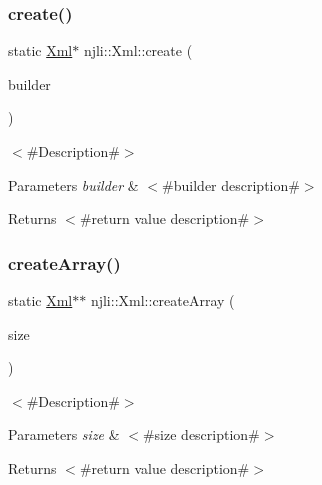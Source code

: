 \subsubsection{\texorpdfstring{create()}{create()}\hspace{0.1cm}{\footnotesize\ttfamily [3/3]}}
{\footnotesize\ttfamily static \mbox{\hyperlink{classnjli_1_1_xml}{Xml}}$\ast$ njli\+::\+Xml\+::create (\begin{DoxyParamCaption}\item[{const \mbox{\hyperlink{classnjli_1_1_xml_builder}{Xml\+Builder}} \&}]{builder }\end{DoxyParamCaption})\hspace{0.3cm}{\ttfamily [static]}}

$<$\#\+Description\#$>$


\begin{DoxyParams}{Parameters}
{\em builder} & $<$\#builder description\#$>$\\
\hline
\end{DoxyParams}
\begin{DoxyReturn}{Returns}
$<$\#return value description\#$>$ 
\end{DoxyReturn}
\mbox{\label{classnjli_1_1_xml_a458f6f226b134cee2bd70e3592a0988b}} 
\subsubsection{\texorpdfstring{create\+Array()}{createArray()}}
{\footnotesize\ttfamily static \mbox{\hyperlink{classnjli_1_1_xml}{Xml}}$\ast$$\ast$ njli\+::\+Xml\+::create\+Array (\begin{DoxyParamCaption}\item[{const \mbox{\hyperlink{_util_8h_a10e94b422ef0c20dcdec20d31a1f5049}{u32}}}]{size }\end{DoxyParamCaption})\hspace{0.3cm}{\ttfamily [static]}}

$<$\#\+Description\#$>$


\begin{DoxyParams}{Parameters}
{\em size} & $<$\#size description\#$>$\\
\hline
\end{DoxyParams}
\begin{DoxyReturn}{Returns}
$<$\#return value description\#$>$ 
\end{DoxyReturn}
\mbox{\label{classnjli_1_1_xml_a1ee896e383ff9e96241ceada752a8324}} 
